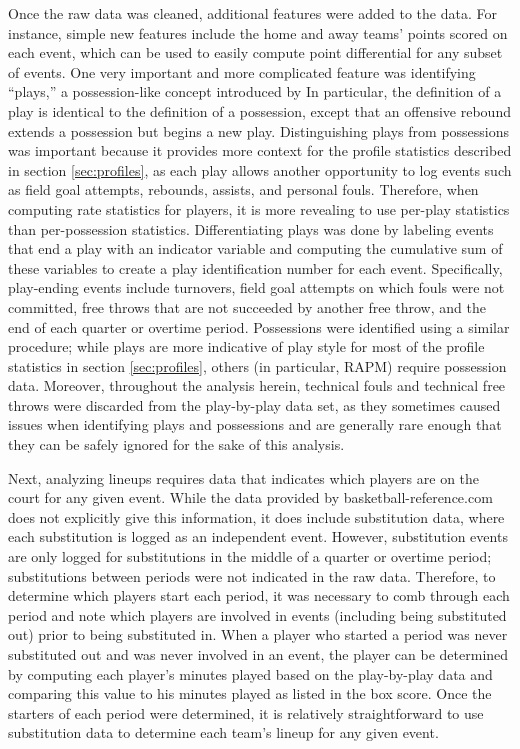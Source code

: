 Once the raw data was cleaned, additional features were added to the data. For
instance, simple new features include the home and away teams' points scored on each
event, which can be used to easily compute point differential for any subset of
events. One very important and more complicated feature was identifying ``plays,'' a
possession-like concept introduced by \citeauthor{Maymin} In particular, the
definition of a play is identical to the definition of a possession, except that an
offensive rebound extends a possession but begins a new play. Distinguishing plays
from possessions was important because it provides more context for the profile
statistics described in section \ref{sec:profiles}, as each play allows another
opportunity to log events such as field goal attempts, rebounds, assists, and
personal fouls. Therefore, when computing rate statistics for players, it is more
revealing to use per-play statistics than per-possession statistics.
Differentiating plays was done by labeling events that end a play with an indicator
variable and computing the cumulative sum of these variables to create a play
identification number for each event. Specifically, play-ending events include
turnovers, field goal attempts on which fouls were not committed, free throws that
are not succeeded by another free throw, and the end of each quarter or overtime
period. Possessions were identified using a similar procedure; while plays are more
indicative of play style for most of the profile statistics in section
\ref{sec:profiles}, others (in particular, RAPM) require possession data. Moreover,
throughout the analysis herein, technical fouls and technical free throws were
discarded from the play-by-play data set, as they sometimes caused issues when
identifying plays and possessions and are generally rare enough that they can be
safely ignored for the sake of this analysis.

Next, analyzing lineups requires data that indicates which players are on the court
for any given event. While the data provided by basketball-reference.com does not
explicitly give this information, it does include substitution data, where each
substitution is logged as an independent event. However, substitution events are
only logged for substitutions in the middle of a quarter or overtime period;
substitutions between periods were not indicated in the raw data. Therefore, to
determine which players start each period, it was necessary to comb through each
period and note which players are involved in events (including being substituted
out) prior to being substituted in. When a player who started a period was never
substituted out and was never involved in an event, the player can be determined by
computing each player's minutes played based on the play-by-play data and comparing
this value to his minutes played as listed in the box score. Once the starters of
each period were determined, it is relatively straightforward to use substitution
data to determine each team's lineup for any given event.

